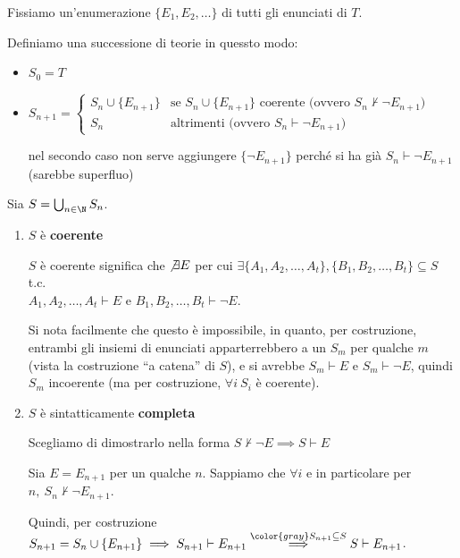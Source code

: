 \documentclass[a4paper,11pt]{report}
\begin{document}
\begin{proofframe}{}{}
Fissiamo un'enumerazione \( \{ E_1, E_2, \dots \} \) di tutti gli enunciati di \( T \).

Definiamo una successione di teorie in quessto modo:
\begin{itemize}
    \item \( S_0 = T \)
    \item \( S_{n+1} = \begin{cases}
            S_n \cup \{ E_{n+1}\} & \text{se } S_n \cup \{E_{n+1}\} \text{ coerente (ovvero } S_n \not\vdash \neg E_{n+1} \text{)} \\
            S_n  & \text{altrimenti (ovvero } S_n \vdash \neg E_{n+1} \text{)} 
    \end{cases} \)

    {\color{gray} \small nel secondo caso non serve aggiungere \( \{\neg E_{n+1}\} \) perché si ha già \( S_n \vdash \neg E_{n+1} \) (sarebbe superfluo)}
\end{itemize}
Sia \( S = \bigcup_{n\in \N} S_n \).
\begin{enumerate}
    \item \( S \) è \textbf{coerente}

        \( S \) è coerente significa che \( \not \exists E \) per cui \( \exists \{A_1, A_2, \dots, A_t\} , \{B_1, B_2, \dots, B_t\} \subseteq S\) t.c.\\ \(  A_1, A_2, \dots, A_t\vdash E\) e \(  B_1, B_2, \dots, B_t\vdash \neg E\).

        Si nota facilmente che questo è impossibile, in quanto, per costruzione, entrambi gli insiemi di enunciati apparterrebbero a un \( S_m \) per qualche \( m \) (vista la costruzione ``a catena'' di \( S \)), e si avrebbe \( S_m \vdash E \) e \( S_m \vdash \neg E \), quindi \( S_m \) incoerente (ma per costruzione, \( \forall i\ S_i \) è coerente).
        

    \item \( S \) è sintatticamente \textbf{completa}

        Scegliamo di dimostrarlo nella forma \( S\not\vdash \neg E \implies S \vdash E \)

        Sia \( E = E_{n+1} \) per un qualche \( n \). Sappiamo che \( \forall i\) e in particolare per \( n, \ S_n\not\vdash \neg E_{n+1}\). 

        Quindi, per costruzione \( S_{n+1} = S_n \cup \{E_{n+1}\} \implies S_{n+1} \vdash E_{n+1} \overset{{\color{gray}S_{n+1}\subseteq S}}{\implies}  S \vdash E_{n+1} \).
\end{enumerate}

\end{proofframe}
\end{document}
